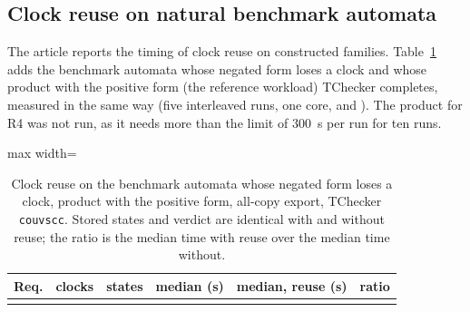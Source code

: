\subsection{Clock reuse on natural benchmark automata}\label{sec:alloc-natural}
The article reports the timing of clock reuse on constructed families. Table~\ref{tab:alloc-natural} adds the benchmark automata whose negated form loses a clock and whose product with the positive form (the reference workload) TChecker completes, measured in the same way (five interleaved runs, one core,  and ). The product for R4 was not run, as it needs more than the limit of 300~s per run for ten runs.

\begin{table}[tp]
\centering
\caption{Clock reuse on the benchmark automata whose negated form loses a clock, product with the positive form, all-copy export, TChecker \texttt{couvscc}. Stored states and verdict are identical with and without reuse; the ratio is the median time with reuse over the median time without.}
\label{tab:alloc-natural}
\small
\begin{adjustbox}{max width=\textwidth}\begin{tabular}{@{}lrrrrr@{}}
\toprule
Req. & clocks & states & median (s) & median, reuse (s) & ratio\\
\midrule
\\
\bottomrule
\end{tabular}\end{adjustbox}
\end{table}

